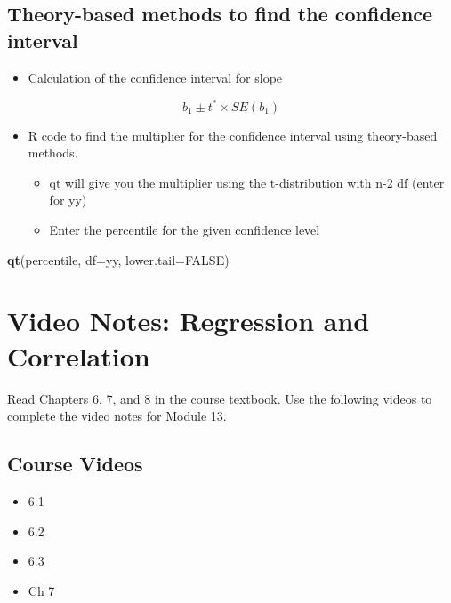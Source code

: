 \documentclass[
]{report}
\newenvironment{Shaded}{\begin{snugshade}}{\end{snugshade}}
\newcommand{\AttributeTok}[1]{\textcolor[rgb]{0.13,0.29,0.53}{#1}}
\newcommand{\ConstantTok}[1]{\textcolor[rgb]{0.56,0.35,0.01}{#1}}
\newcommand{\FunctionTok}[1]{\textcolor[rgb]{0.13,0.29,0.53}{\textbf{#1}}}
\newcommand{\NormalTok}[1]{#1}
\providecommand{\tightlist}{%
  \setlength{\itemsep}{0pt}\setlength{\parskip}{0pt}}
\begin{document}
\subsection*{Theory-based methods to find the confidence interval}\label{theory-based-methods-to-find-the-confidence-interval-1}

\begin{itemize}
\tightlist
\item
  Calculation of the confidence interval for slope
\end{itemize}

\[b_1\pm t^*\times SE(b_1)\]

\begin{itemize}
\item
  R code to find the multiplier for the confidence interval using theory-based methods.

  \begin{itemize}
  \item
    qt will give you the multiplier using the t-distribution with n-2 df (enter for yy)
  \item
    Enter the percentile for the given confidence level
  \end{itemize}
\end{itemize}

\begin{Shaded}
\begin{Highlighting}[]
\FunctionTok{qt}\NormalTok{(percentile, }\AttributeTok{df=}\NormalTok{yy, }\AttributeTok{lower.tail=}\ConstantTok{FALSE}\NormalTok{)}
\end{Highlighting}
\end{Shaded}

\newpage

\section{Video Notes: Regression and Correlation}\label{video-notes-regression-and-correlation}

Read Chapters 6, 7, and 8 in the course textbook. Use the following videos to complete the video notes for Module 13.

\subsection{Course Videos}\label{course-videos-10}

\begin{itemize}
\item
  6.1
\item
  6.2
\item
  6.3
\item
  Ch 7
\end{itemize}
\end{document}
